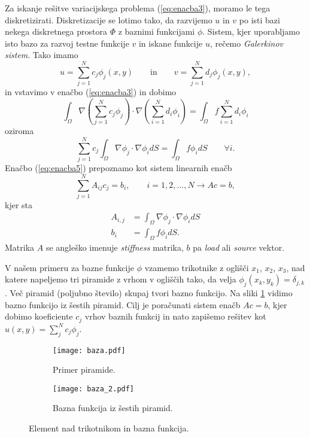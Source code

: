 \documentclass[12pt,a4paper]{article}
\begin{document}
Za iskanje rešitve variacijskega problema (\ref{eq:enacba3}), moramo le tega diskretizirati. Diskretizacije se lotimo tako, da razvijemo $u$ in $v$ po isti bazi nekega diskretnega prostora $\Phi$ z baznimi funkcijami $\phi$. Sistem, kjer uporabljamo isto bazo za razvoj testne funkcije $v$ in iskane funkcije $u$, rečemo \textit{Galerkinov sistem}. Tako imamo
\begin{equation} \label{eq:enacba4}
u= \sum _{j=1} ^{N} c_j \phi _j(x,y) \qquad \textrm{in} \qquad v=\sum _{j=1} ^{N} d_j \phi _j(x,y),
\end{equation}
in vstavimo v enačbo (\ref{eq:enacba3}) in dobimo
\begin{equation*}
\int _{\Omega} \nabla \left(\sum _{j=1} ^{N} c_j \phi _j\right)  \cdot \nabla \left( \sum _{i=1} ^{N} d_i \phi _i \right) = \int _{\Omega} f \sum _{i=1} ^{N} d_i \phi _i
\end{equation*}
oziroma 
\begin{equation} \label{eq:enacba5}
\sum _{j=1} ^{N} c_j \int_{\Omega} \nabla \phi_j \cdot \nabla \phi_i dS= \int _{\Omega} f \phi_i dS \qquad \forall i.
\end{equation}
Enačbo (\ref{eq:enacba5}) prepoznamo kot sistem linearnih enačb
\begin{equation}
\sum _{j=1} ^{N} A_{ij} c_j = b_i, \qquad i=1,2,...,N \rightarrow Ac=b,
\end{equation}
kjer sta
\begin{align}
A_{i,j}&= \int _{\Omega} \nabla \phi_j \cdot \nabla \phi _i dS  \label{eq:enacba7} \\
b_i &= \int _{\Omega} f \phi _i dS. \label{eq:enacba8}
\end{align}
Matrika $A$ se angleško imenuje \textit{stiffness} matrika, $b$ pa \textit{load} ali \textit{source} vektor.

V našem primeru za bazne funkcije $\phi$ vzamemo trikotnike z oglišči $x_1$, $x_2$, $x_3$, nad katere napeljemo tri piramide z vrhom v ogliščih tako, da velja $\phi_j(x_k,y_k)= \delta _{j,k}$. Več piramid (poljubno število) skupaj tvori bazno funkcijo. Na sliki \ref{fig:slika1} vidimo bazno funkcijo iz šestih piramid. Cilj je poračunati sistem enačb $Ac=b$, kjer dobimo koeficiente $c_j$ vrhov baznih funkcij in nato zapišemo rešitev kot $u(x,y)=\sum _j ^{N} c_j \phi _j$.

\begin{figure}[H]
    \centering
    \begin{subfigure}[b]{0.2\textwidth}  			
        \texttt{[image: baza.pdf]}
        \caption{Primer piramide.}
    \end{subfigure}
    \hspace{5em}%
    \begin{subfigure}[b]{0.3\textwidth}
        \texttt{[image: baza\_2.pdf]}
        \caption{Bazna funkcija iz šestih piramid.}
    \end{subfigure}
    \caption{Element nad trikotnikom in bazna funkcija.} \label{fig:slika1}
\end{figure}
\end{document}
